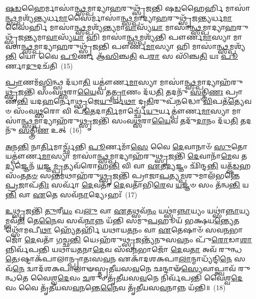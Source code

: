 {%
\-\ul{𑌷}\-\-\ul{𑌡}\-𑌹𑍈𑌰𑍍𑌮𑌾𑌸𑌾॑\-\ul{𑌨𑍍𑌥𑍍𑌸}\-𑌮𑍍𑌪𑌾𑌦𑍍𑌯𑌾\-\ul{𑌹}\-𑌰𑍁𑌥𑍍𑌸𑍃᳴𑌜𑌨𑍍𑌤𑌿 𑌷\-\ul{𑌡}\-𑌹𑍈𑌰𑍍\mbox{}𑌹𑌿 𑌮𑌾𑌸𑌾॑\-\ul{𑌨𑍍𑌥𑍍𑌸}\-𑌮𑍍𑌪𑌶𑍍𑌯᳴𑌨𑍍𑌤𑍍𑌯𑌰𑍍𑌧\-\ul{𑌮𑌾}\-𑌸𑍈𑌰𑍍𑌮𑌾𑌸𑌾॑\-\ul{𑌨𑍍𑌥𑍍𑌸}\-𑌮𑍍𑌪𑌾𑌦𑍍𑌯𑌾\-\ul{𑌹}\-𑌰𑍁𑌥𑍍𑌸𑍃᳴𑌜𑌨𑍍𑌤𑍍𑌯𑌰𑍍𑌧\-\ul{𑌮𑌾}\-𑌸𑍈𑌰𑍍\mbox{}𑌹𑌿 𑌮𑌾𑌸𑌾॑\-\ul{𑌨𑍍𑌥𑍍𑌸}\-𑌮𑍍𑌪𑌶𑍍𑌯᳴𑌨𑍍𑌤𑍍𑌯𑌮𑌾\-\ul{𑌵𑌾}\-𑌸𑍍𑌯᳴\-\ul{𑌯𑌾} 𑌮𑌾𑌸𑌾॑\-\ul{𑌨𑍍𑌥𑍍𑌸}\-𑌮𑍍𑌪𑌾𑌦𑍍𑌯𑌾\-\ul{𑌹}\-𑌰𑍁𑌥𑍍𑌸𑍃᳴𑌜𑌨𑍍𑌤𑍍𑌯𑌮𑌾\-\ul{𑌵𑌾}\-𑌸𑍍𑌯᳴\-\ul{𑌯𑌾} 𑌹𑌿 𑌮𑌾𑌸𑌾॑\-\ul{𑌨𑍍𑌥𑍍𑌸}\-𑌮𑍍𑌪𑌶𑍍𑌯᳴𑌨𑍍𑌤𑌿 𑌪𑍗𑌰𑍍𑌣\-\ul{𑌮𑌾}\-𑌸𑍍𑌯𑌾 𑌮𑌾𑌸𑌾॑\-\ul{𑌨𑍍𑌥𑍍𑌸}\-𑌮𑍍𑌪𑌾𑌦𑍍𑌯𑌾\-\ul{𑌹}\-𑌰𑍁𑌥𑍍𑌸𑍃᳴𑌜𑌨𑍍𑌤𑌿 𑌪𑍗𑌰𑍍𑌣\-\ul{𑌮𑌾}\-𑌸𑍍𑌯𑌾 𑌹𑌿 𑌮𑌾𑌸𑌾॑\-\ul{𑌨𑍍𑌥𑍍𑌸}\-𑌮𑍍𑌪𑌶𑍍𑌯᳴\-\ul{𑌨𑍍𑌤𑌿} 𑌯𑍋 𑌵𑍈 \ul{𑌪𑍂}\-𑌰𑍍𑌣 𑌆᳴\-\ul{𑌸𑌿}\-𑌞𑍍𑌚\-\ul{𑌤𑌿} 𑌪\-\ul{𑌰𑌾} 𑌸 𑌸𑌿᳴𑌞𑍍𑌚\-\ul{𑌤𑌿} 𑌯𑌃 \ul{𑌪𑍂}\-𑌰𑍍𑌣𑌾\-\ul{𑌦𑍁}\-𑌦𑌚᳴𑌤𑌿~(15)

\-\ul{𑌪𑍍𑌰𑌾}\-𑌣𑌮᳴\-\ul{𑌸𑍍𑌮𑌿}\-𑌨𑍍𑌥𑍍𑌸 𑌦᳴𑌧𑌾\-\ul{𑌤𑌿} 𑌯𑌤𑍍𑌪𑍗॑𑌰𑍍𑌣\-\ul{𑌮𑌾}\-𑌸𑍍𑌯𑌾 𑌮𑌾𑌸𑌾॑\-\ul{𑌨𑍍𑌥𑍍𑌸}\-𑌮𑍍𑌪𑌾𑌦𑍍𑌯𑌾𑌹᳴𑌰𑍁\-\ul{𑌥𑍍𑌸𑍃}\-𑌜𑌨𑍍𑌤𑌿᳴ 𑌸𑌂𑌵\-\ul{𑌥𑍍𑌸}\-𑌰𑌾\-\ul{𑌯𑍈}\-𑌵 𑌤\-\ul{𑌤𑍍𑌪𑍍𑌰𑌾}\-𑌣𑌂 𑌦᳴𑌧\-\ul{𑌤𑌿} 𑌤𑌦𑌨𑍁᳴ \ul{𑌸}\-𑌤𑍍𑌤𑍍𑌰𑌿\-\ul{𑌣𑌃} 𑌪𑍍𑌰𑌾𑌣᳴\-\ul{𑌨𑍍𑌤𑌿} 𑌯𑌦\-\ul{𑌹}\-𑌰𑍍𑌨𑍋\-\ul{𑌥𑍍𑌸𑍃}\-𑌜𑍇\-\ul{𑌯𑍁}\-𑌰𑍍𑌯\-\ul{𑌥𑌾} 𑌦𑍃\-\ul{𑌤𑌿}\-𑌰𑍁𑌪᳴𑌨𑌦𑍍𑌧𑍋 \ul{𑌵𑌿}\-𑌪𑌤᳴\-\ul{𑌤𑍍𑌯𑍇}\-𑌵𑍞 𑌸𑌂᳴𑌵\-\ul{𑌥𑍍𑌸}\-𑌰𑍋 𑌵𑌿 𑌪᳴\-\ul{𑌤𑍇}\-𑌦𑌾\-\ul{𑌰𑍍𑌤𑌿}\-𑌮𑌾𑌰𑍍𑌚𑍍𑌛𑍇᳴\-\ul{𑌯𑍁}\-𑌰𑍍𑌯𑌤𑍍𑌪𑍗॑𑌰𑍍𑌣\-\ul{𑌮𑌾}\-𑌸𑍍𑌯𑌾 𑌮𑌾𑌸𑌾॑\-\ul{𑌨𑍍𑌥𑍍𑌸}\-𑌮𑍍𑌪𑌾𑌦𑍍𑌯𑌾𑌹᳴𑌰𑍁\-\ul{𑌥𑍍𑌸𑍃}\-𑌜𑌨𑍍𑌤𑌿᳴ 𑌸𑌂𑌵\-\ul{𑌥𑍍𑌸}\-𑌰𑌾\-\ul{𑌯𑍈}\-𑌵 𑌤𑌦𑍁᳴\-\ul{𑌦𑌾}\-𑌨𑌂 𑌦᳴𑌧\-\ul{𑌤𑌿} 𑌤𑌦𑌨𑍁᳴ \ul{𑌸}\-𑌤𑍍𑌤𑍍𑌰𑌿\-\ul{𑌣} 𑌉𑌤𑍍~(16)

\-\ul{𑌅}\-\-\ul{𑌨}\-\-\ul{𑌨𑍍𑌤𑌿} 𑌨𑌾\-\ul{𑌰𑍍𑌤𑌿}\-𑌮𑌾𑌰𑍍𑌚𑍍𑌛᳴𑌨𑍍𑌤𑌿 \ul{𑌪𑍂}\-𑌰𑍍𑌣𑌮𑌾᳴\-\ul{𑌸𑍇} 𑌵𑍈 \ul{𑌦𑍇}\-𑌵𑌾𑌨𑌾𑍞᳴ \ul{𑌸𑍁}\-𑌤𑍋 𑌯𑌤𑍍𑌪𑍗॑𑌰𑍍𑌣\-\ul{𑌮𑌾}\-𑌸𑍍𑌯𑌾 𑌮𑌾𑌸𑌾॑\-\ul{𑌨𑍍𑌥𑍍𑌸}\-𑌮𑍍𑌪𑌾𑌦𑍍𑌯𑌾𑌹᳴𑌰𑍁\-\ul{𑌥𑍍𑌸𑍃}\-𑌜𑌨𑍍𑌤𑌿᳴ \ul{𑌦𑍇}\-𑌵𑌾𑌨𑌾᳴\-\ul{𑌮𑍇}\-𑌵 𑌤\-\ul{𑌦𑍍𑌯}\-𑌜𑍍𑌞𑍇𑌨᳴ \ul{𑌯}\-𑌜𑍍𑌞\-\ul{𑌮𑍍𑌪𑍍𑌰}\-𑌤𑍍𑌯𑌵᳴𑌰𑍋𑌹\-\ul{𑌨𑍍𑌤𑌿} 𑌵𑌿 𑌵𑌾 \ul{𑌏}\-𑌤\-\ul{𑌦𑍍𑌯}\-𑌜𑍍𑌞𑌂 𑌛𑌿᳴𑌨𑍍𑌦\-\ul{𑌨𑍍𑌤𑌿} 𑌯𑌤𑍍𑌷᳴\-\ul{𑌡}\-𑌹𑌸𑌂᳴𑌤\-\ul{𑌤}\-\-\ul{𑍞} 𑌸\-\ul{𑌨𑍍𑌤}\-𑌮𑌥𑌾𑌹᳴𑌰𑍁\-\ul{𑌥𑍍𑌸𑍃}\-𑌜𑌨𑍍𑌤𑌿᳴ 𑌪𑍍𑌰𑌾𑌜𑌾\-\ul{𑌪}\-𑌤𑍍𑌯\-\ul{𑌮𑍍𑌪}\-𑌶𑍁𑌮𑌾𑌲᳴𑌭𑌨𑍍𑌤𑍇 \ul{𑌪𑍍𑌰}\-𑌜𑌾𑌪᳴\-\ul{𑌤𑌿𑌃} 𑌸𑌰𑍍𑌵𑌾᳴ \ul{𑌦𑍇}\-𑌵𑌤𑌾᳴ \ul{𑌦𑍇}\-𑌵𑌤𑌾᳴𑌭𑌿\-\ul{𑌰𑍇}\-𑌵 \ul{𑌯}\-𑌜𑍍𑌞𑍞 𑌸𑌂 𑌤᳴𑌨𑍍𑌵\-\ul{𑌨𑍍𑌤𑌿} 𑌯\-\ul{𑌨𑍍𑌤𑌿} 𑌵𑌾 \ul{𑌏}\-𑌤𑍇 𑌸𑌵᳴\-\ul{𑌨𑌾}\-𑌦𑍍𑌯𑍇\-𑌽𑌹𑌃᳴~(17)

\-\ul{𑌉}\-\-\ul{𑌥𑍍𑌸𑍃}\-𑌜𑌨𑍍𑌤𑌿᳴ \ul{𑌤𑍁}\-𑌰𑍀\-\ul{𑌯𑌂} 𑌖\-\ul{𑌲𑍁} 𑌵𑌾 \ul{𑌏}\-𑌤𑌥𑍍𑌸𑌵᳴\-\ul{𑌨𑌂} 𑌯𑌥𑍍𑌸𑌾॑\-\ul{𑌨𑍍𑌨𑌾}\-𑌯𑍍𑌯𑌂 𑌯𑌥𑍍𑌸𑌾॑\-\ul{𑌨𑍍𑌨𑌾}\-𑌯𑍍𑌯𑌮𑍍𑌭𑌵᳴\-\ul{𑌤𑌿} 𑌤𑍇\-\ul{𑌨𑍈}\-𑌵 𑌸𑌵᳴\-\ul{𑌨𑌾}\-𑌨𑍍𑌨 𑌯᳴𑌨𑍍𑌤𑌿 𑌸𑌮𑍁\-\ul{𑌪}\-𑌹𑍂𑌯᳴ 𑌭𑌕𑍍𑌷𑌯\-\ul{𑌨𑍍𑌤𑍍𑌯𑍇}\-𑌤𑌥𑍍𑌸𑍋᳴𑌮𑌪𑍀\-\ul{𑌥𑌾} 𑌹𑍍𑌯𑍇᳴𑌤𑌰𑍍\mbox{}𑌹𑌿᳴ 𑌯𑌥𑌾𑌯\-\ul{𑌤}\-𑌨𑌂 𑌵𑌾 \ul{𑌏}\-𑌤𑍇𑌷𑌾𑍞᳴ 𑌸𑌵\-\ul{𑌨}\-𑌭𑌾𑌜𑍋᳴ \ul{𑌦𑍇}\-𑌵𑌤𑌾᳴ 𑌗𑌚𑍍𑌛\-\ul{𑌨𑍍𑌤𑌿} 𑌯𑍇\-𑌽𑌹᳴𑌰𑍁\-\ul{𑌥𑍍𑌸𑍃}\-𑌜𑌨𑍍𑌤𑍍𑌯᳴𑌨𑍁𑌸\-\ul{𑌵}\-𑌨𑌂 𑌪𑍁᳴\-\ul{𑌰𑍋}\-𑌡𑌾\-\ul{𑌶𑌾}\-𑌨𑍍𑌨𑌿𑌰𑍍𑌵᳴𑌪𑌨𑍍𑌤𑌿 𑌯𑌥𑌾𑌯\-\ul{𑌤}\-𑌨𑌾\-\ul{𑌦𑍇}\-𑌵 𑌸᳴𑌵\-\ul{𑌨}\-𑌭𑌾𑌜𑍋᳴ \ul{𑌦𑍇}\-𑌵\-\ul{𑌤𑌾} 𑌅𑌵᳴ 𑌰𑍁𑌨𑍍𑌧\-\ul{𑌤𑍇}\-\-𑌽𑌷𑍍𑌟𑌾𑌕᳴𑌪𑌾𑌲𑌾𑌨𑍍𑌪𑍍𑌰𑌾𑌤𑌃𑌸\-\ul{𑌵}\-𑌨 𑌏𑌕𑌾᳴\-𑌦𑌶\-𑌕𑌪𑌾\-\ul{𑌲𑌾}\-\-𑌨𑍍𑌮𑌾𑌧𑍍𑌯᳴𑌨𑍍𑌦𑌿\-\ul{𑌨𑍇} 𑌸𑌵᳴\-\ul{𑌨𑍇} 𑌦𑍍𑌵𑌾𑌦᳴𑌶\-𑌕𑌪𑌾𑌲𑌾𑍟𑌸𑍍𑌤𑍃𑌤𑍀𑌯𑌸\-\ul{𑌵}\-𑌨𑍇 𑌛𑌨𑍍𑌦𑌾𑍟᳴\-\ul{𑌸𑍍𑌯𑍇}\-𑌵𑌾𑌪𑍍𑌤𑍍𑌵𑌾𑌵᳴ 𑌰𑍁𑌨𑍍𑌧𑌤𑍇 𑌵𑍈𑌶𑍍𑌵\-\ul{𑌦𑍇}\-𑌵𑌂 \ul{𑌚}\-𑌰𑍁𑌂 𑌤𑍃᳴𑌤𑍀𑌯𑌸\-\ul{𑌵}\-𑌨𑍇 𑌨𑌿𑌰𑍍𑌵᳴𑌪𑌨𑍍𑌤𑌿 𑌵𑍈𑌶𑍍𑌵\-\ul{𑌦𑍇}\-𑌵𑌂 𑌵𑍈 𑌤𑍃᳴𑌤𑍀𑌯𑌸\-\ul{𑌵}\-𑌨𑌨𑍍𑌤𑍇\-\ul{𑌨𑍈}\-𑌵 𑌤𑍃᳴𑌤𑍀𑌯𑌸\-\ul{𑌵}\-𑌨𑌾𑌨𑍍𑌨 𑌯᳴𑌨𑍍𑌤𑌿॥~(18)

}
